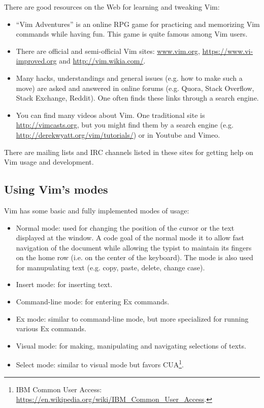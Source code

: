 \documentclass{article}
\begin{document}
There are good resources on the Web for learning
and tweaking Vim:
\begin{itemize}
  \item ``Vim Adventures'' is an online RPG game for practicing
  and memorizing Vim commands while having fun.
  This game is quite famous among Vim users.
  \item There are official and semi-official Vim sites:
  \url{www.vim.org}, \url{https://www.vi-improved.org} and
  \url{http://vim.wikia.com/}.
  \item Many hacks, understandings and general issues
  (e.g. how to make such a move) are asked and answered
  in online forums (e.g. Quora, Stack Overflow, Stack Exchange, Reddit).
  One often finds these links through a search engine.
  \item You can find many videos about Vim.
  One traditional site is \url{http://vimcasts.org},
  but you might find them by a search engine (e.g. \url{http://derekwyatt.org/vim/tutorials/}) or in Youtube and Vimeo.
\end{itemize}

There are mailing lists and IRC channels listed in these
sites for getting help on Vim usage and development.


\subsection{Using Vim's modes}
Vim has some basic and fully implemented modes of usage:
\begin{itemize}
  \item Normal mode: used for changing
  the position of the cursor or the text displayed
  at the window.
  A code goal of the normal mode it to allow fast
  navigation of the document while allowing
  the typist to maintain its fingers on the home row
  (i.e. on the center of the keyboard).
  The mode is also used for manupulating text
  (e.g. copy, paste, delete, change case).
  \item Insert mode: for inserting text.
  \item Command-line mode: for entering Ex commands.
  \item Ex mode: similar to command-line mode,
  but more specialized for running various Ex commands.
  \item Visual mode: for making, manipulating and navigating
  selections of texts.
  \item Select mode: similar to visual mode but
  favors CUA\footnote{IBM Common User Access: \url{https://en.wikipedia.org/wiki/IBM_Common_User_Access}.}.
\end{itemize}
\end{document}
